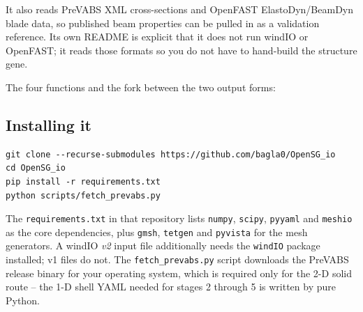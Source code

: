 It also reads PreVABS XML cross-sections and OpenFAST ElastoDyn/BeamDyn blade
data, so published beam properties can be pulled in as a validation reference.
Its own README is explicit that it does not run windIO or OpenFAST; it reads
those formats so you do not have to hand-build the structure gene.

The four functions and the fork between the two output forms:


\subsection*{Installing it}

\begin{lstlisting}[style=shellst]
git clone --recurse-submodules https://github.com/bagla0/OpenSG_io
cd OpenSG_io
pip install -r requirements.txt
python scripts/fetch_prevabs.py
\end{lstlisting}

The \texttt{requirements.txt} in that repository lists \texttt{numpy},
\texttt{scipy}, \texttt{pyyaml} and \texttt{meshio} as the core dependencies,
plus \texttt{gmsh}, \texttt{tetgen} and \texttt{pyvista} for the mesh
generators. A windIO \emph{v2} input file additionally needs the
\texttt{windIO} package installed; v1 files do not. The
\texttt{fetch\_prevabs.py} script downloads the PreVABS release binary for your
operating system, which is required only for the 2-D solid route -- the 1-D
shell YAML needed for stages 2 through 5 is written by pure Python.

